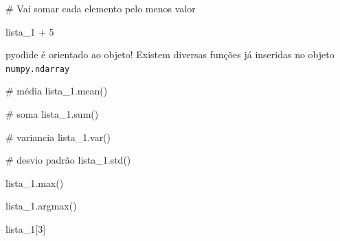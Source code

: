 \documentclass[
  letterpaper,
  DIV=11,
  numbers=noendperiod]{scrreprt}
\newenvironment{Shaded}{\begin{snugshade}}{\end{snugshade}}
\newcommand{\NormalTok}[1]{\textcolor[rgb]{0.00,0.23,0.31}{#1}}
\begin{document}
\begin{Shaded}
\begin{Highlighting}[]
\NormalTok{\# Vai somar cada elemento pelo menos valor}

\NormalTok{lista\_1 + 5}
\end{Highlighting}
\end{Shaded}

pyodide é orientado ao objeto! Existem diversas funções já inseridas no
objeto \texttt{numpy.ndarray}

\begin{Shaded}
\begin{Highlighting}[]
\NormalTok{\# média}
\NormalTok{lista\_1.mean()}
\end{Highlighting}
\end{Shaded}

\begin{Shaded}
\begin{Highlighting}[]
\NormalTok{\# soma}
\NormalTok{lista\_1.sum()}
\end{Highlighting}
\end{Shaded}

\begin{Shaded}
\begin{Highlighting}[]
\NormalTok{\# variancia}
\NormalTok{lista\_1.var()}
\end{Highlighting}
\end{Shaded}

\begin{Shaded}
\begin{Highlighting}[]
\NormalTok{\# desvio padrão}
\NormalTok{lista\_1.std()}
\end{Highlighting}
\end{Shaded}

\begin{Shaded}
\begin{Highlighting}[]
\NormalTok{lista\_1.max()}
\end{Highlighting}
\end{Shaded}

\begin{Shaded}
\begin{Highlighting}[]
\NormalTok{lista\_1.argmax()}
\end{Highlighting}
\end{Shaded}

\begin{Shaded}
\begin{Highlighting}[]
\NormalTok{lista\_1[3]}
\end{Highlighting}
\end{Shaded}
\end{document}
